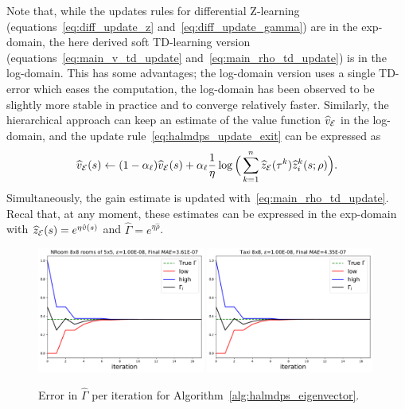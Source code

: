 Note that, while the updates rules for differential Z-learning (equations~\eqref{eq:diff_update_z} and~\eqref{eq:diff_update_gamma}) are in the exp-domain, the here derived soft TD-learning version (equations~\eqref{eq:main_v_td_update} and~\eqref{eq:main_rho_td_update}) is in the log-domain. This has some advantages; the log-domain version uses a single TD-error which eases the computation, the log-domain has been observed to be slightly more stable in practice and to converge relatively faster. Similarly, the hierarchical approach can keep an estimate of the value function $\widehat v_{\mathcal{E}}$ in the log-domain, and the update rule~\eqref{eq:halmdps_update_exit} can be expressed as 
\begin{equation*}
    \widehat v_{\mathcal{E}}(s)\gets (1-\alpha_\ell) \widehat v_{\mathcal{E}}(s) + \alpha_\ell\frac{1}{\eta} \log\Big(\sum_{k=1}^n \widehat z_{\mathcal{E}}(\tau^k) \widehat z_i^k(s;\rho)\Big).
\end{equation*}
Simultaneously, the gain estimate is updated with~\eqref{eq:main_rho_td_update}. Recal that, at any moment, these estimates can be expressed in the exp-domain with $\widehat z_{\mathcal{E}}(s)=e^{\eta\hat v(s)}$ and $\widehat\Gamma=e^{\eta\hat\rho}$.


\begin{figure}[!ht]
  \centering
  \includegraphics*[width=0.49\textwidth]{figures/chapter2/eigenvectors/lmdp-nroom-3.pdf}
  \includegraphics*[width=0.49\textwidth]{figures/chapter2/eigenvectors/lmdp-taxi-8.pdf}
  \caption{Error in $\widehat\Gamma$ per iteration for Algorithm~\ref{alg:halmdps_eigenvector}.}
  \label{fig:eigenvectos}
 \end{figure}

